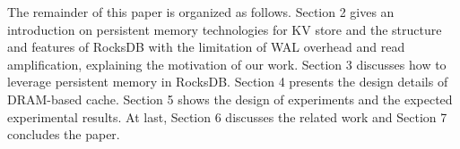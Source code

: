 The remainder of this paper is organized as follows. Section 2 gives an introduction on persistent memory technologies for KV store and the structure and features of RocksDB with the limitation of WAL overhead and read amplification, explaining the motivation of our work. Section 3 discusses how to leverage persistent memory in RocksDB. Section 4 presents the design details of DRAM-based cache. Section 5 shows the design of experiments and the expected experimental results. At last, Section 6 discusses the related work and Section 7 concludes the paper.